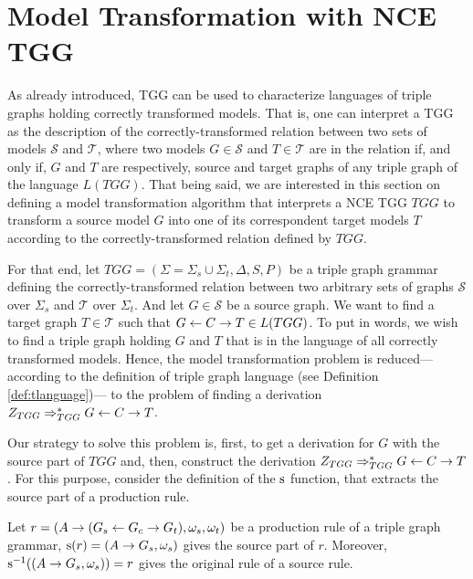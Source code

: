 \documentclass[runningheads]{llncs}
\begin{document}
\section{Model Transformation with NCE TGG}
\label{sec:modeltrans}
As already introduced, TGG can be used to characterize languages of triple graphs holding correctly transformed models. That is, one can interpret a TGG as the description of the correctly-transformed relation between two sets of models $\mathcal{S}$ and $\mathcal{T}$, where two models $G \in \mathcal{S}$ and $T \in \mathcal{T}$ are in the relation if, and only if, $G$ and $T$ are respectively, source and target graphs of any triple graph of the language $L(TGG)$. That being said, we are interested in this section on defining a model transformation algorithm that interprets a NCE TGG $\mathit{TGG}$ to transform a source model $G$ into one of its correspondent target models $T$ according to the correctly-transformed relation defined by $\mathit{TGG}$.

For that end, let $\mathit{TGG} = (\Sigma = \Sigma_s \cup \Sigma_t, \Delta, S, P)$ be a triple graph grammar defining the correctly-transformed relation between two arbitrary sets of graphs $\mathcal{S}$ over $\Sigma_s$ and $\mathcal{T}$ over $\Sigma_t$. And let $G \in \mathcal{S}$ be a source graph. We want to find a target graph $T \in \mathcal{T}$ such that $G \overset{}{\leftarrow} C \overset{}{\rightarrow} T \in L(TGG)$. To put in words, we wish to find a triple graph holding $G$ and $T$ that is in the language of all correctly transformed models. Hence, the model transformation problem is reduced--- according to the definition of triple graph language (see Definition \ref{def:tlanguage})--- to the problem of finding a derivation $Z_{TGG} \Rightarrow^*_{TGG} G \overset{}{\leftarrow} C \overset{}{\rightarrow} T$.

Our strategy to solve this problem is, first, to get a derivation for $G$ with the source part of $\mathit{TGG}$ and, then, construct the derivation $Z_{TGG} \Rightarrow^*_{TGG} G \overset{}{\leftarrow} C \overset{}{\rightarrow} T$. For this purpose, consider the definition of the $\operatorname{s}$ function, that extracts the source part of a production rule.

\begin{definition}
	\label{def:source}
	Let $r = (A \to (G_s \overset{}{\leftarrow} G_c \overset{}{\rightarrow} G_t), \omega_s, \omega_t)$ be a production rule of a triple graph grammar, $\operatorname{s}(r) = (A \to G_s,\omega_s)$ gives the source part of $r$. Moreover, $\operatorname{s}^{-1}((A \to G_s,\omega_s)) = r$ gives the original rule of a source rule.
\end{definition}
\end{document}
